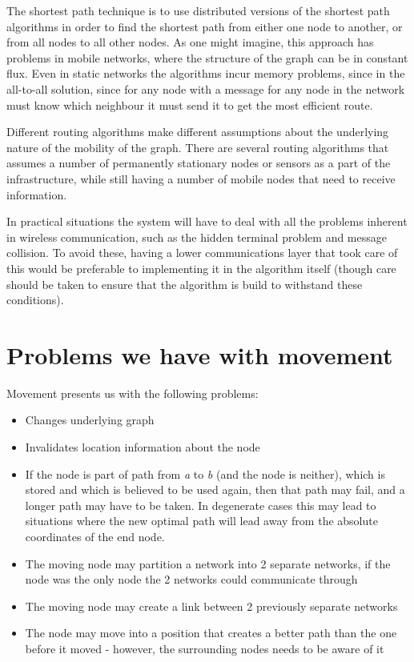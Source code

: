 \documentclass[letter, 12pt, english, draft]{article}
\begin{document}
\begin{description}
{The shortest path technique is to use distributed versions of the shortest path algorithms in order to find the shortest path from either one node to another, or from all nodes to all other nodes. As one might imagine, this approach has problems in mobile networks, where the structure of the graph can be in constant flux. Even in static networks the algorithms incur memory problems, since in the all-to-all solution, since for any node with a message for any node in the network must know which neighbour it must send it to get the most efficient route.}
{}  

\end{description}

Different routing algorithms make different assumptions about the underlying nature of the mobility of the graph. There are several routing algorithms \cite{adaptive, two-tier} that assumes a number of permanently stationary nodes or sensors as a part of the infrastructure, while still having a number of mobile nodes that need to receive information. 

In practical situations the system will have to deal with all the problems inherent in wireless communication, such as the hidden terminal problem and message collision. To avoid these, having a lower communications layer that took care of this would be preferable to implementing it in the algorithm itself (though care should be taken to ensure that the algorithm is build to withstand these conditions).

\section{Problems we have with movement}





Movement presents us with the following problems:

\begin{itemize}
\item Changes underlying graph
\item Invalidates location information about the node
\item If the node is part of path from \emph{a} to \emph{b} (and the node is neither), which is stored and which is believed to be used again, then that path may fail, and a longer path may have to be taken. In degenerate cases this may lead to situations where the new optimal path will lead away from the absolute coordinates of the end node.
\item The moving node may partition a network into 2 separate networks, if the node was the only node the 2 networks could communicate through
\item The moving node may create a link between 2 previously separate networks
\item The node may move into a position that creates a better path than the one before it moved - however, the surrounding nodes needs to be aware of it
\end{itemize}
\end{document}

